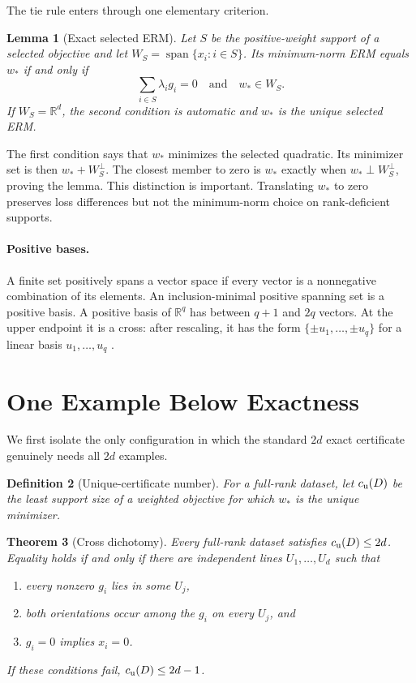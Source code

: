 \documentclass[twoside]{article}
\newtheorem{theorem}{Theorem}
\newtheorem{lemma}[theorem]{Lemma}
\newtheorem{definition}[theorem]{Definition}
\newcommand{\R}{\mathbb R}
\newcommand{\spanop}{\operatorname{span}}
\begin{document}
The tie rule enters through one elementary criterion.

\begin{lemma}[Exact selected ERM]
\label{lem:tie}
Let $S$ be the positive-weight support of a selected objective and let $W_S=\spanop\{x_i:i\in S\}$. Its minimum-norm ERM equals $w_*$ if and only if
\begin{equation}
 \sum_{i\in S}\lambda_i g_i=0
 \quad\text{and}\quad w_*\in W_S.
 \label{eq:tie-criterion}
\end{equation}
If $W_S=\R^d$, the second condition is automatic and $w_*$ is the unique selected ERM.
\end{lemma}

The first condition says that $w_*$ minimizes the selected quadratic. Its minimizer set is then $w_*+W_S^\perp$. The closest member to zero is $w_*$ exactly when $w_*\perp W_S^\perp$, proving the lemma. This distinction is important. Translating $w_*$ to zero preserves loss differences but not the minimum-norm choice on rank-deficient supports.

\paragraph{Positive bases.}
A finite set positively spans a vector space if every vector is a nonnegative combination of its elements. An inclusion-minimal positive spanning set is a positive basis. A positive basis of $\R^q$ has between $q+1$ and $2q$ vectors. At the upper endpoint it is a cross: after rescaling, it has the form $\{\pm u_1,\ldots,\pm u_q\}$ for a linear basis $u_1,\ldots,u_q$ \citep{davis1954positive,regis2016positive}.

\section{One Example Below Exactness}

We first isolate the only configuration in which the standard $2d$ exact certificate genuinely needs all $2d$ examples.

\begin{definition}[Unique-certificate number]
For a full-rank dataset, let $c_{\rm u}(D)$ be the least support size of a weighted objective for which $w_*$ is the unique minimizer.
\end{definition}

\begin{theorem}[Cross dichotomy]
\label{thm:cross}
Every full-rank dataset satisfies $c_{\rm u}(D)\leq2d$. Equality holds if and only if there are independent lines $U_1,\ldots,U_d$ such that
\begin{enumerate}
\item every nonzero $g_i$ lies in some $U_j$,
\item both orientations occur among the $g_i$ on every $U_j$, and
\item $g_i=0$ implies $x_i=0$.
\end{enumerate}
If these conditions fail, $c_{\rm u}(D)\leq2d-1$.
\end{theorem}
\end{document}
